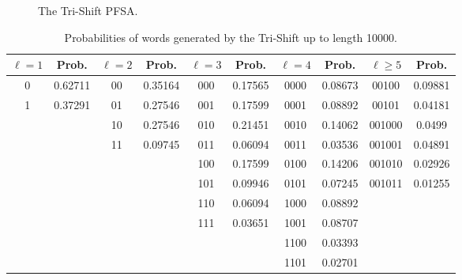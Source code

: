 {\begin{figure}
\centering
{}
\caption{The Tri-Shift PFSA.\label{fig:trishift}}
\end{figure}

\begin{table}
\centering
\caption{Probabilities of words generated by the Tri-Shift up to length 10000. \label{tab:trishiftsub}}
\begin{tabular}{|c|c|c|c|c|c|c|c|c|c|}
\hline
$\ell = 1$ & Prob. & $\ell = 2$ & Prob. & $\ell = 3$ & Prob. & $\ell = 4$ & Prob. & $\ell \geq 5$ & Prob.\\
\hline
0 & 0.62711 & 00 & 0.35164 & 000 & 0.17565 & 0000 & 0.08673 & 00100 & 0.09881\\
1 & 0.37291 & 01 & 0.27546 & 001 & 0.17599 & 0001 & 0.08892 & 00101 & 0.04181\\
  &      & 10 & 0.27546 & 010 & 0.21451 & 0010 & 0.14062 & 001000 & 0.0499\\
  &      & 11 & 0.09745 & 011 & 0.06094 & 0011 & 0.03536 & 001001 & 0.04891\\
  &	     &    &      & 100 & 0.17599 & 0100 & 0.14206 & 001010 & 0.02926\\
  &      &    &      & 101 & 0.09946 & 0101 & 0.07245 & 001011 & 0.01255\\
  &      &    &      & 110 & 0.06094 & 1000 & 0.08892 &        &     \\
  &      &    &      & 111 & 0.03651 & 1001 & 0.08707 &        &     \\
  &      &    &      &     &      & 1100 & 0.03393 &        &     \\
  &      &    &      &     &      & 1101 & 0.02701 &        &     \\
\hline
\end{tabular}
\end{table}

}
